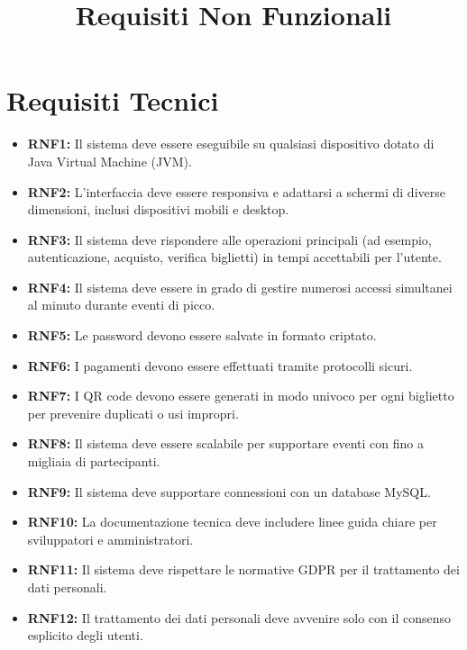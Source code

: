 \documentclass[a4paper,12pt]{article}
\title{\textcolor{titlecolor}{\Huge Requisiti Non Funzionali \vspace{0.2cm}}}
\author{}
\date{}
\begin{document}
\maketitle

\section*{\textcolor{sectioncolor}{Requisiti Tecnici}}
\textcolor{textcolor}{
\begin{itemize}
    \item \textbf{RNF1:} Il sistema deve essere eseguibile su qualsiasi dispositivo dotato di Java Virtual Machine (JVM).
    \item \textbf{RNF2:} L'interfaccia deve essere responsiva e adattarsi a schermi di diverse dimensioni, inclusi dispositivi mobili e desktop.
    \item \textbf{RNF3:} Il sistema deve rispondere alle operazioni principali (ad esempio, autenticazione, acquisto, verifica biglietti) in tempi accettabili per l'utente.
    \item \textbf{RNF4:} Il sistema deve essere in grado di gestire numerosi accessi simultanei al minuto durante eventi di picco.
    \item \textbf{RNF5:} Le password devono essere salvate in formato criptato.
    \item \textbf{RNF6:} I pagamenti devono essere effettuati tramite protocolli sicuri.
    \item \textbf{RNF7:} I QR code devono essere generati in modo univoco per ogni biglietto per prevenire duplicati o usi impropri.
    \item \textbf{RNF8:} Il sistema deve essere scalabile per supportare eventi con fino a migliaia di partecipanti.
    \item \textbf{RNF9:} Il sistema deve supportare connessioni con un database MySQL.
    \item \textbf{RNF10:} La documentazione tecnica deve includere linee guida chiare per sviluppatori e amministratori.
    \item \textbf{RNF11:} Il sistema deve rispettare le normative GDPR per il trattamento dei dati personali.
    \item \textbf{RNF12:} Il trattamento dei dati personali deve avvenire solo con il consenso esplicito degli utenti.
\end{itemize}
}
\end{document}
